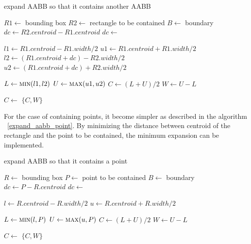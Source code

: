 \documentclass[10pt,letterpaper,twocolumn]{article}
\begin{document}
\begin{algorithm}
    \caption{expand AABB so that it contains another AABB}
    \label{expand_aabb_aabb}
    \begin{algorithmic}
        \State $R1 \gets$ bounding box
        \State $R2 \gets$ rectangle to be contained
        \State $B  \gets$ boundary
            \State $dc \gets R2.centroid - R1.centroid$
            \State $dc \gets$ 

            \State $l1 \gets R1.centroid - R1.width / 2$
            \State $u1 \gets R1.centroid + R1.width / 2$
            \State $l2 \gets (R1.centroid + dc) - R2.width / 2$
            \State $u2 \gets (R1.centroid + dc) + R2.width / 2$

            \State $L \gets \Call{min}{l1, l2}$
            \State $U \gets \Call{max}{u1, u2}$
            \State $C \gets (L + U) / 2$
            \State $W \gets U - L$

            \State $C \gets$ 
            \State \Return $\{C, W\}$
        \EndFunction
     \end{algorithmic}
\end{algorithm}

For the case of containing points, it become simpler as described in the
algorithm ~\ref{expand_aabb_point}. By minimizing the distance between centroid
of the rectangle and the point to be contained, the minimum expansion can be
implemented.

\begin{algorithm}
    \caption{expand AABB so that it contains a point}
    \label{expand_aabb_point}
    \begin{algorithmic}
        \State $R \gets$ bounding box
        \State $P \gets$ point to be contained
        \State $B \gets$ boundary
            \State $dc \gets P - R.centroid$
            \State $dc \gets$ 

            \State $l \gets R.centroid - R.width / 2$
            \State $u \gets R.centroid + R.width / 2$

            \State $L \gets \Call{min}{l, P}$
            \State $U \gets \Call{max}{u, P}$
            \State $C \gets (L + U) / 2$
            \State $W \gets U - L$

            \State $C \gets$ 
            \State \Return $\{C, W\}$
        \EndFunction
     \end{algorithmic}
\end{algorithm}
\end{document}
